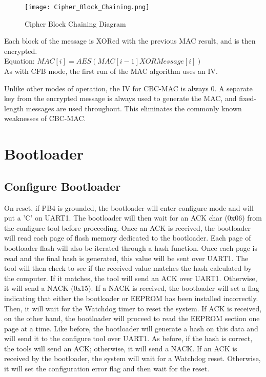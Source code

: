 \documentclass[11pt]{article}
\begin{document}
\begin{figure}[!h]
\begin{center}
\texttt{[image: Cipher\_Block\_Chaining.png]}
\caption{Cipher Block Chaining Diagram}
\end{center}
\end{figure}

Each block of the message is XORed with the previous MAC result, and is then encrypted.\\ 

Equation: $MAC[i] = AES( MAC[i - 1] XOR Message[i] )$\\

As with CFB mode, the first run of the MAC algorithm uses an IV. 

Unlike other modes of operation, the IV for CBC-MAC is always 0. A separate key from the encrypted message is always used to generate the MAC, and fixed-length messages are used throughout. This eliminates the commonly known weaknesses of CBC-MAC.

\section{Bootloader}
\subsection{Configure Bootloader}
On reset, if PB4 is grounded, the bootloader will enter configure mode and will put a 'C' on UART1.  The bootloader will then wait for an ACK char (0x06) from the configure tool before proceeding.  Once an ACK is received, the bootloader will read each page of flash memory dedicated to the bootloader.  Each page of bootloader flash will also be iterated through a hash function.  Once each page is read and the final hash is generated, this value will be sent over UART1.  The tool will then check to see if the received value matches the hash calculated by the computer.  If it matches, the tool will send an ACK over UART1.  Otherwise, it will send a NACK (0x15).  If a NACK is received, the bootloader will set a flag indicating that either the bootloader or EEPROM has been installed incorrectly.  Then, it will wait for the Watchdog timer to reset the system.  If ACK is received, on the other hand, the bootloader will proceed to read the EEPROM section one page at a time.  Like before, the bootloader will generate a hash on this data and will send it to the configure tool over UART1.  As before, if the hash is correct, the tools will send an ACK; otherwise, it will send a NACK.  If an ACK is received by the bootloader, the system will wait for a Watchdog reset.  Otherwise, it will set the configuration error flag and then wait for the reset.
\end{document}
